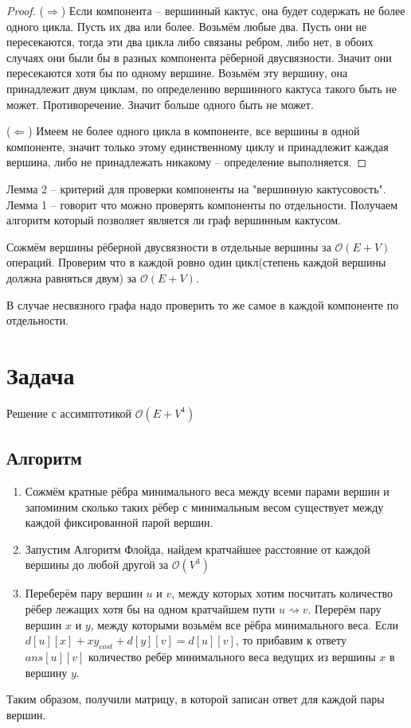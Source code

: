 \documentclass{article}
\newcommand{\complexity}[1]{$\mathcal{O}(#1)$}
\begin{document}
    \begin{proof}
        ($\Rightarrow$)
        Если компонента -- вершинный кактус, она будет содержать не более одного цикла. Пусть их два или более. Возьмём любые два. Пусть они не пересекаются, тогда эти два цикла либо связаны ребром, либо нет, в обоих случаях они были бы в разных компонента рёберной двусвязности. Значит они пересекаются хотя бы по одному вершине. Возьмём эту вершину, она принадлежит двум циклам, по определению вершинного кактуса такого быть не может. Противоречение. Значит больше одного быть не может.
        
        ($\Leftarrow$) Имеем не более одного цикла в компоненте, все вершины в одной компоненте, значит только этому единственному циклу и принадлежит каждая вершина, либо не принадлежать никакому -- определение выполняется.
    \end{proof}
    Лемма 2 -- критерий для проверки компоненты на "вершинную кактусовость". Лемма 1 -- говорит что можно проверять компоненты по отдельности. Получаем алгоритм который позволяет является ли граф вершинным кактусом.
    
    Сожмём вершины рёберной двусвязности в отдельные вершины за \complexity{E + V} операций. Проверим что в каждой ровно один цикл(степень каждой вершины должна равняться двум) за \complexity{E + V}. 
    
    В случае несвязного графа надо проверить то же самое в каждой компоненте по отдельности.
\section*{Задача }
    Решение с ассимптотикой \complexity{E + V^{4}}
    \subsection*{Алгоритм} 
    \begin{enumerate}
        \item Сожмём кратные рёбра минимального веса между всеми парами вершин и запоминим сколько таких рёбер с минимальным весом существует между каждой фиксированной парой вершин.
        \item Запустим Алгоритм Флойда, найдем кратчайшее расстояние от каждой вершины до любой другой за \complexity{V^{3}}
        \item Переберём пару вершин $u$ и $v$, между которых хотим посчитать количество рёбер лежащих хотя бы на одном кратчайшем пути $u \rightsquigarrow v$. Перерём пару вершин $x$ и $y$, между которыми возьмём все рёбра минимального веса. Если $d[u][x] + xy_{cost} + d[y][v] = d[u][v]$, то прибавим к ответу $ans[u][v]$ количество ребёр минимального веса ведущих из вершины $x$ в вершину $y$.
    \end{enumerate}
    Таким образом, получили матрицу, в которой записан ответ для каждой пары вершин.
\end{document}
